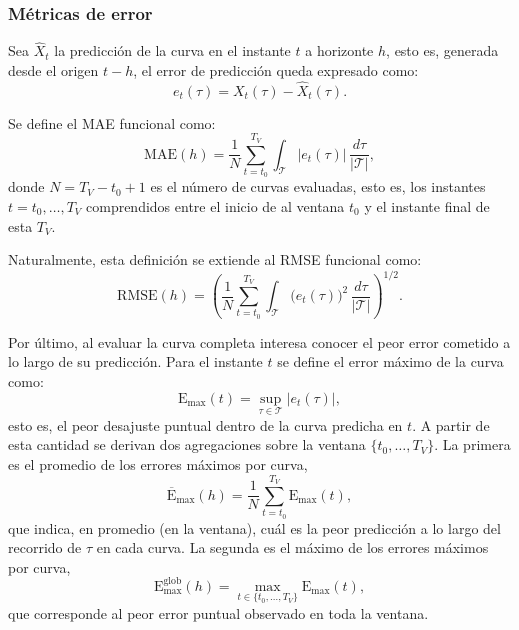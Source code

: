 \subsubsection{Métricas de error}
\label{02_02_03_02_metricas_error}

Sea $\hat{X}_{t}$ la predicción de la curva en el instante $t$ a horizonte $h$, esto es, generada desde el origen $t-h$, el error de predicción queda expresado como:
\begin{equation}
    e_{t}(\tau) = X_{t}(\tau) - \hat{X}_{t}(\tau).
\end{equation}

Se define el MAE funcional como:
\begin{equation}
    \mathrm{MAE}(h) = \frac{1}{N}\sum_{t=t_0}^{T_V}
    \int_{\mathcal{T}} \bigl|e_{t}(\tau)\bigr| \, \frac{d\tau}{|\mathcal{T}|},
\end{equation}
donde $N = T_V - t_0 + 1$ es el número de curvas evaluadas, esto es, los instantes $t = t_0, \dots, T_V$ comprendidos entre el inicio de al ventana $t_0$ y el instante final de esta $T_V$.

Naturalmente, esta definición se extiende al RMSE funcional como:
\begin{equation}
    \mathrm{RMSE}(h) = \left(\frac{1}{N}\sum_{t=t_0}^{T_V}
    \int_{\mathcal{T}} \bigl(e_{t}(\tau)\bigr)^2 \, \frac{d\tau}{|\mathcal{T}|}
    \right)^{1/2}.
\end{equation}

Por último, al evaluar la curva completa interesa conocer el peor error cometido a lo largo de su predicción. Para el instante $t$ se define el error máximo de la curva como:
\begin{equation}
    \mathrm{E}_{\max}(t) = \sup_{\tau \in \mathcal{T}} \bigl|e_{t}(\tau)\bigr|,
\end{equation}
esto es, el peor desajuste puntual dentro de la curva predicha en $t$. A partir de esta cantidad se derivan dos agregaciones sobre la ventana $\{t_0, \dots, T_V\}$. La primera es el promedio de los errores máximos por curva,
\begin{equation}
    \overline{\mathrm{E}}_{\max}(h) = \frac{1}{N}\sum_{t=t_0}^{T_V}
    \mathrm{E}_{\max}(t),
\end{equation}
que indica, en promedio (en la ventana), cuál es la peor predicción a lo largo del recorrido de $\tau$ en cada curva. La segunda es el máximo de los errores máximos por curva,
\begin{equation}
    \mathrm{E}_{\max}^{\text{glob}}(h) = \max_{t \in \{t_0, \dots, T_V\}}
    \mathrm{E}_{\max}(t),
\end{equation}
que corresponde al peor error puntual observado en toda la ventana.

